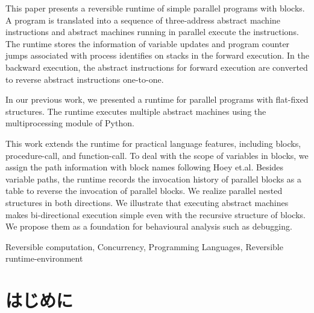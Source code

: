 \documentclass[submit,PRO]{ipsj}
\begin{document}
\begin{eabstract}
This paper presents a reversible runtime of simple parallel programs
with blocks.  A program is translated into a sequence of three-address
abstract machine instructions and abstract machines running in
parallel execute the instructions.  The runtime stores the information
of variable updates and program counter jumps associated with process
identifies on stacks in the forward execution. In the backward
execution, the abstract instructions for forward execution are
converted to reverse abstract instructions one-to-one.

In our previous work, we presented a runtime for parallel programs with
flat-fixed structures.  The runtime executes multiple abstract
machines using the multiprocessing module of Python.

This work extends the runtime for practical language features,
including blocks, procedure-call, and function-call. To deal with the
scope of variables in blocks, we assign the path information with
block names following Hoey et.al.  Besides variable paths, the runtime
records the invocation history of parallel blocks as a table to
reverse the invocation of parallel blocks.  We realize parallel nested
structures in both directions.  We illustrate that executing abstract
machines makes bi-directional execution simple even with the recursive
structure of blocks.  We propose them as a foundation for behavioural
analysis such as debugging.

\end{eabstract}

\begin{ekeyword}
Reversible computation, Concurrency, Programming Languages, Reversible runtime-environment
\end{ekeyword}

\maketitle

\section{はじめに}
\end{document}
